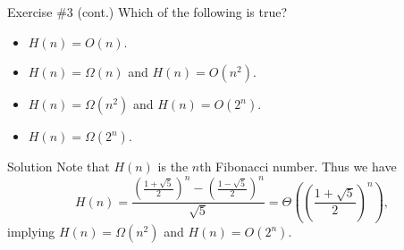 \documentclass{beamer}
\begin{document}
\begin{frame}{Exercise \#3 (cont.)}
  Which of the following is true?
  \begin{itemize}
    \item $H(n) = O(n)$.
    \item $H(n) = \Omega(n)$ and $H(n) = O(n^2)$.
    \item $H(n) = \Omega(n^2)$ and $H(n) = O(2^n)$.
    \item $H(n) = \Omega(2^n)$. \pause
  \end{itemize}
  \begin{block}{Solution}
    Note that $H(n)$ is the $n$th Fibonacci number. \pause
    Thus we have
    \begin{equation*}
      H(n)
      = \frac{\left(\frac{1+\sqrt{5}}{2}\right)^n
        - \left(\frac{1-\sqrt{5}}{2}\right)^n}{\sqrt{5}}
      = \Theta\left(\left(\frac{1+\sqrt{5}}{2}\right)^n\right),
    \end{equation*}
    implying $H(n) = \Omega(n^2)$ and $H(n) = O(2^n)$.
  \end{block}
\end{frame}
\end{document}

